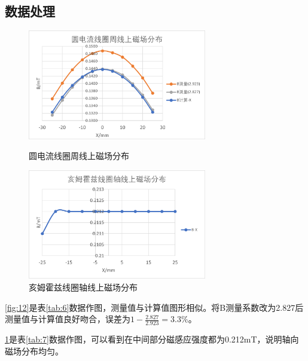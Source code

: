 \documentclass[11pt]{article}
\begin{document}
\subsection{数据处理}
\begin{figure}[H]
    \centering
    \begin{minipage}[t]{0.49\linewidth}
        \centering
        \includegraphics[width=7.8cm]{Fig/12.png}
        \caption{圆电流线圈周线上磁场分布}
        \label{fig:12}
    \end{minipage}
    \begin{minipage}[t]{0.49\linewidth}
        \centering
        \includegraphics[width=7.8cm]{Fig/13.png}
        \caption{亥姆霍兹线圈轴线上磁场分布}
        \label{fig:13}
    \end{minipage}
\end{figure}
\par \cref{fig:12}是表\ref{tab:6}数据作图，测量值与计算值图形相似。将B测量系数改为2.827后测量值与计算值良好吻合，误差为$1-\frac{2.827}{2.923}=3.3\%$。
\par \cref{fig:13}是表\ref{tab:7}数据作图，可以看到在中间部分磁感应强度都为0.212mT，说明轴向磁场分布均匀。
\end{document}
